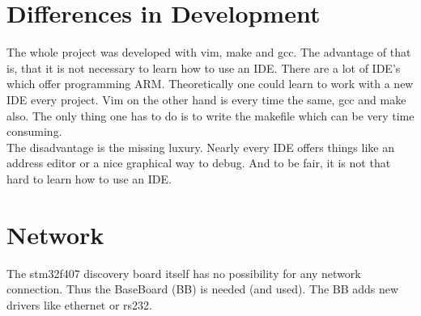 \section{Differences in Development}
The whole project was developed with vim, make and gcc.
 The advantage of that is, that it is not necessary to learn how to use an IDE.
 There are a lot of IDE's which offer programming ARM. Theoretically one could 
learn to work with a new IDE every project. Vim on the other hand is every time 
the same, gcc and make also. The only thing one has to do is to write the 
 makefile which can be very time consuming.\\
The disadvantage is the missing luxury. Nearly every IDE offers things like an
address editor or a nice graphical way to debug. And to be fair, it is not that
hard to learn how to use an IDE.\citep{EM-14}

\section{Network}
The stm32f407 discovery board itself has no possibility for any network connection.
Thus the BaseBoard (BB) is needed (and used). The BB adds new drivers like ethernet
or rs232.
